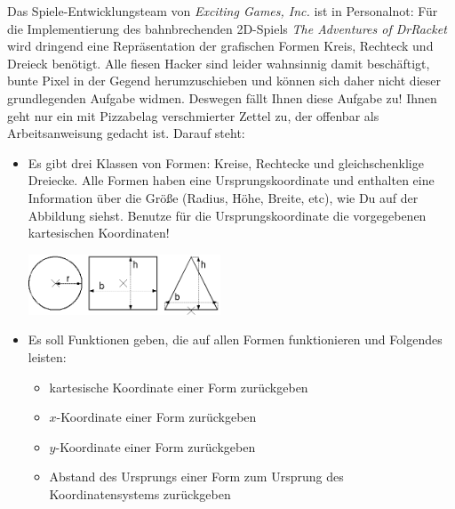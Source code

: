 \begin{aufgabe}

  Das Spiele-Entwicklungsteam von
  \textit{Exciting Games, Inc.} ist in Personalnot: Für die
  Implementierung des bahnbrechenden 2D-Spiels \textit{The Adventures
    of DrRacket} wird dringend eine Repräsentation der grafischen
  Formen Kreis, Rechteck und Dreieck benötigt.  Alle fiesen Hacker
  sind leider wahnsinnig damit beschäftigt, bunte Pixel in der Gegend
  herumzuschieben und können sich daher nicht dieser grundlegenden
  Aufgabe widmen.  Deswegen fällt Ihnen diese Aufgabe zu!  Ihnen geht
  nur ein mit Pizzabelag verschmierter Zettel zu, der offenbar als
  Arbeitsanweisung gedacht ist.  Darauf steht:
  \begin{itemize}

  \item Es gibt drei Klassen von Formen: Kreise, Rechtecke und
    gleichschenklige Dreiecke.  Alle Formen haben eine
    Ursprungskoordinate und enthalten eine Information über die Größe
    (Radius, Höhe, Breite, etc), wie Du auf der Abbildung siehst.
    Benutze für die Ursprungskoordinate die vorgegebenen kartesischen
    Koordinaten!

    \begin{center}
      \includegraphics[height=1.8cm]{i1gem/shapes.png}
    \end{center}

  \item Es soll Funktionen geben, die auf allen Formen funktionieren
    und Folgendes leisten:

    \begin{itemize}

    \item kartesische Koordinate einer Form zurückgeben

    \item $x$-Koordinate einer Form zurückgeben

    \item $y$-Koordinate einer Form zurückgeben

    \item Abstand des Ursprungs einer Form zum Ursprung des
      Koordinatensystems zurückgeben


\end{itemize}
\end{itemize}
\end{aufgabe}
